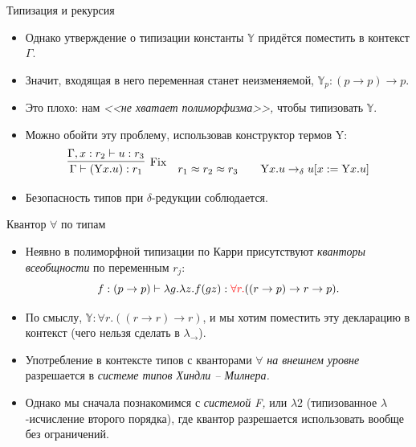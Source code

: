 \documentclass[xcolor=dvipsnames]{beamer}
\newcommand{\Yr}{\mathrm{Y}}
\newcommand{\Yb}{\mathbb{Y}}
\begin{document}
\begin{frame}{Типизация и рекурсия}

\begin{itemize}[<+->]
 \item Однако утверждение о типизации константы $\Yb$ придётся поместить в контекст $\Gamma$.
 \item Значит, входящая в него переменная станет неизменяемой, $\Yb\!_p : (p \to p) \to p$.
 \item Это плохо: нам {\em <<не хватает полиморфизма>>,} чтобы типизовать $\Yb$.
 \item Можно обойти эту проблему, использовав конструктор термов $\Yr$:
 \[
  \infer[\mathrm{Fix}]
  {\Gamma \vdash (\Yr x. u) : r_1}
  {\Gamma, x : r_2 \vdash u : r_3}
  \quad
  r_1 \approx r_2 \approx r_3 
  \qquad
  \Yr x. u \to_\delta u[x := \Yr x.u]
 \]
 \item Безопасность типов при $\delta$-редукции соблюдается.

\end{itemize}

 
\end{frame}

\begin{frame}{Квантор $\forall$ по типам}

\begin{itemize}[<+->]
 \item Неявно в полиморфной типизации по Карри присутствуют {\em кванторы всеобщности} по переменным $r_j$:
 \[
  f : (p \to p) \vdash 
  \lambda g . \lambda z. f (g z) :
  {\color{red} \forall r.} 
  ((r \to p) \to r \to p).
 \]
 \item По смыслу, $\Yb : \forall r . ((r \to r) \to r)$, и мы хотим поместить эту декларацию в контекст (чего нельзя сделать в $\lambda_\to$).
 \item Употребление в контексте типов с кванторами $\forall$
 {\em на внешнем уровне} разрешается в {\em системе типов Хиндли -- Милнера.}
 \item Однако мы сначала познакомимся с {\em системой F,} или $\lambda 2$ (типизованное $\lambda$-исчисление второго порядка), где квантор разрешается использовать вообще без ограничений.
\end{itemize}

 
\end{frame}
\end{document}
